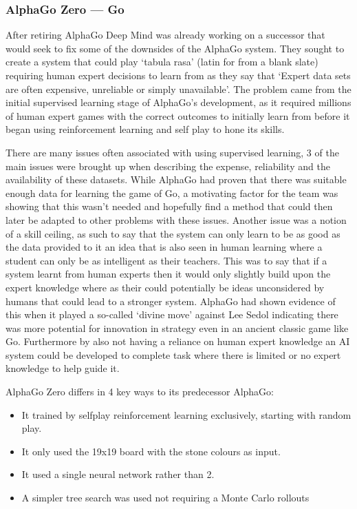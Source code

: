 \documentclass[a4paper]{article}
\begin{document}
\subsubsection{AlphaGo Zero --- Go}
After retiring AlphaGo Deep Mind was already working on a successor that would seek to fix some of the downsides of the AlphaGo system.
They sought to create a system that could play `tabula rasa' (latin for from a blank slate) requiring human expert decisions to learn from as they say that `Expert data sets are often expensive, unreliable or simply unavailable'\cite{alphaGoZero}.
The problem came from the initial supervised learning stage of AlphaGo's development, as it required millions of human expert games with the correct outcomes to initially learn from before it began using reinforcement learning and self play to hone its skills.
\par
There are many issues often associated with using supervised learning, 3 of the main issues were brought up when describing the expense, reliability and the availability of these datasets.
While AlphaGo had proven that there was suitable enough data for learning the game of Go, a motivating factor for the team was showing that this wasn't needed and hopefully find a method that could then later be adapted to other problems with these issues.
Another issue was a notion of a skill ceiling, as such to say that the system can only learn to be as good as the data provided to it an idea that is also seen in human learning where a student can only be as intelligent as their teachers.
This was to say that if a system learnt from human experts then it would only slightly build upon the expert knowledge where as their could potentially be ideas unconsidered by humans that could lead to a stronger system.
AlphaGo had shown evidence of this when it played a so-called `divine move' against Lee Sedol indicating there was more potential for innovation in strategy even in an ancient classic game like Go.
Furthermore by also not having a reliance on human expert knowledge an AI system could be developed to complete task where there is limited or no expert knowledge to help guide it.
\par
AlphaGo Zero differs in 4 key ways to its predecessor AlphaGo:
\begin{itemize}
    \item It trained by selfplay reinforcement learning exclusively, starting with random play.
    \item It only used the 19x19 board with the stone colours as input.
    \item It used a single neural network rather than 2.
    \item A simpler tree search was used not requiring a Monte Carlo rollouts
\end{itemize}
\end{document}
